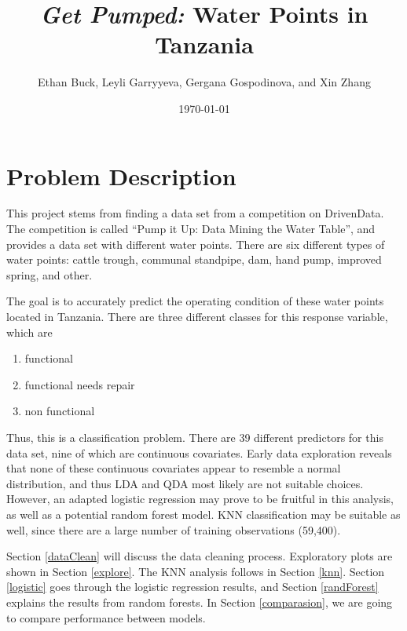 \documentclass{article}
\title{\textit{Get Pumped:} Water Points in Tanzania}
\author{Ethan Buck, Leyli Garryyeva, Gergana Gospodinova, and Xin Zhang}
\date{\today}
\begin{document}
\maketitle

\section{Problem Description}
This project stems from finding a data set from a competition on DrivenData. The competition is called ``Pump it Up: Data Mining the Water Table'', and provides a data set with different water points. There are six different types of water points: cattle trough, communal standpipe, dam, hand pump, improved spring, and other.

The goal is to accurately predict the operating condition of these water points located in Tanzania. There are three different classes for this response variable, which are

\begin{enumerate}
    \item functional
    \item functional needs repair
    \item non functional
\end{enumerate}

Thus, this is a classification problem. There are 39 different predictors for this data set, nine of which are continuous covariates. Early data exploration reveals that none of these continuous covariates appear to resemble a normal distribution, and thus LDA and QDA most likely are not suitable choices. However, an adapted logistic regression may prove to be fruitful in this analysis, as well as a potential random forest model. KNN classification may be suitable as well, since there are a large number of training observations (59,400).

Section \ref{dataClean} will discuss the data cleaning process. Exploratory plots are shown in Section \ref{explore}. The KNN analysis follows in Section \ref{knn}. Section \ref{logistic} goes through the logistic regression results, and Section \ref{randForest} explains the results from random forests. In Section \ref{comparasion}, we are going to compare performance between models.










\end{document}
